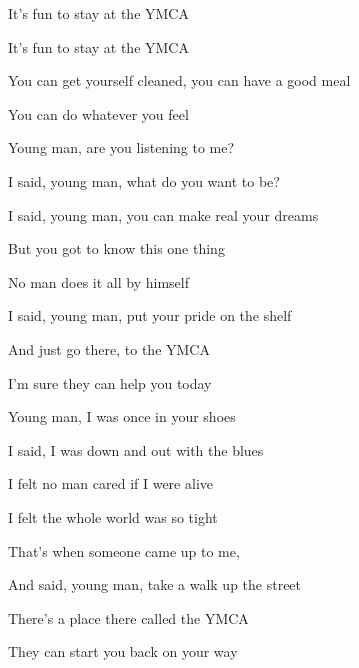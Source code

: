 \begin{song}
\begin{chorusbox}{\Chorus}
\bigskip

It's fun to stay at the YMCA \par
It's fun to stay at the YMCA \par
You can get yourself cleaned, you can have a good meal \par
You can do whatever you feel \par
\end{chorusbox}

\bigskip

Young man, are you listening to me? \par
I said, young man, what do you want to be? \par
I said, young man, you can make real your dreams \par
But you got to know this one thing \par

\bigskip

No man does it all by himself \par
I said, young man, put your pride on the shelf \par
And just go there, to the YMCA \par
I'm sure they can help you today \par
{}  \par

\bigskip

\Chorus

\bigskip

Young man, I was once in your shoes \par
I said, I was down and out with the blues \par
I felt no man cared if I were alive \par
I felt the whole world was so tight \par

\bigskip

That's when someone came up to me, \par
And said, young man, take a walk up the street \par
There's a place there called the YMCA \par
They can start you back on your way \par

  \par

\bigskip

\Chorus \par
{}

\end{song}